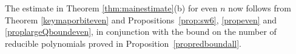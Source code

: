 The estimate in Theorem \ref{thm:mainestimate}(b) for even $n$ now
follows from Theorem \ref{keymaporbiteven} and Propositions~\ref{prop:sw6},
\ref{propeven} and \ref{proplargeQboundeven}, in conjunction with the
bound on the number of reducible polynomials proved in
Proposition~\ref{propredboundall}.
